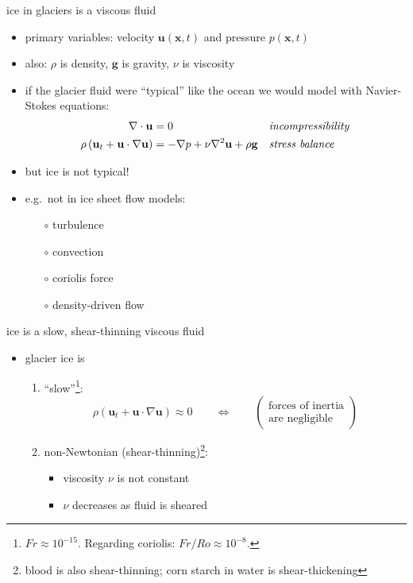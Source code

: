 \documentclass[hide notes,intlimits]{beamer}
\newcommand{\bx}{\mathbf{x}}
\begin{document}
\begin{frame}{ice in glaciers is a viscous fluid}

\begin{itemize}
\item primary variables: velocity $\mathbf{u}(\bx,t)$ and pressure $p(\bx,t)$
\item also: $\rho$ is density, $\mathbf{g}$ is gravity, $\nu$ is viscosity
\item if the glacier fluid were ``typical'' like the ocean we would model with Navier-Stokes equations:
\begin{align*}
\nabla \cdot \mathbf{u} &= 0 &&\text{\emph{incompressibility}} \\
\rho \left(\mathbf{u}_t + \mathbf{u}\cdot\nabla \mathbf{u}\right) &= -\nabla p + \nu \nabla^2 \mathbf{u} + \rho \mathbf{g} &&\text{\emph{stress balance}}
\end{align*}
\item but ice is not typical!
\item e.g.~not in ice sheet flow models:
  \begin{itemize}
  \item[$\circ$] turbulence
  \item[$\circ$] convection
  \item[$\circ$] coriolis force
  \item[$\circ$] density-driven flow
  \end{itemize}
\end{itemize}
\end{frame}


\begin{frame}{ice is a slow, shear-thinning viscous fluid}

\begin{itemize}
\item glacier ice is
  \begin{enumerate}
  \item ``slow''\footnote{$Fr\approx 10^{-15}$.  Regarding coriolis: $Fr/Ro \approx 10^{-8}$.}:
    $$\rho \left(\mathbf{u}_t + \mathbf{u}\cdot\nabla \mathbf{u}\right) \approx 0 \qquad \iff \qquad \begin{pmatrix} \text{forces of inertia} \\ \text{are negligible} \end{pmatrix}$$
  \item non-Newtonian (shear-thinning)\footnote{blood is also shear-thinning; corn starch in water is shear-thickening}:
    \begin{itemize}
    \item viscosity $\nu$ is not constant
    \item $\nu$ decreases as fluid is sheared
    \end{itemize}
  \end{enumerate}
\end{itemize}
\end{frame}
\end{document}
